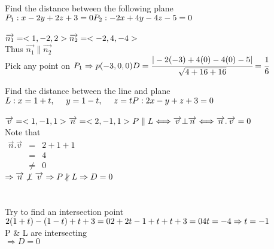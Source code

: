 \noindent{\color{smalt(darkpowderblue)}\rule{\linewidth}{.2mm}}
\begin{example}
Find the distance between the following plane\\ 
$P_1 : x-2y+2z+3=0 \\ 
P_2 : -2x+4y-4z-5=0 $\\
{} \\ 
$\overrightarrow{n_1}=<1,-2,2> \\
\overrightarrow{n_2}=<-2,4,-4>$ \\
Thus $ \overrightarrow{n_1} \parallel 
\overrightarrow{n_2} $\\
Pick any point on $P_1 \Rightarrow p(-3,0,0) \\
D=\cfrac{|-2(-3)+4(0)-4(0)-5|}{\sqrt{4+16+16}} =\cfrac{1}{6}$
\end{example}
\noindent{\color{smalt(darkpowderblue)}\rule{\linewidth}{.2mm}}

\begin{example}
Find the distance between the line and plane \\
$L : x=1+t, ~~~~ y=1-t, ~~~~ z=t \\
P : 2x-y+z+3=0$\\
{} \\ 
$\overrightarrow{v}=<1,-1,1> \\ \overrightarrow{n}=<2,-1,1> \\ 
P \parallel L \Longleftrightarrow \overrightarrow{v} \bot \overrightarrow{n} \Longleftrightarrow \overrightarrow{n} . \overrightarrow{v}=0$\\ 
Note that \\
$\begin{array}{rcl}
\overrightarrow{n} . \overrightarrow{v} & = & 2+1+1 \\
 & = & 4  \\
 & \neq & 0
\end{array}$ \\
$\Rightarrow \overrightarrow{n} \not\perp \overrightarrow{v} \\
\Rightarrow P \nparallel L \\
\Rightarrow D=0$ \\ \\
{} \\ 
Try to find an intersection point \\ 
$2(1+t)-(1-t)+t+3=0 \\
2+2t-1+t+t+3=0 \\ 4t=-4 \Rightarrow t=-1$ \\
P \& L are intersecting \\
$\Rightarrow D=0$
\end{example}

